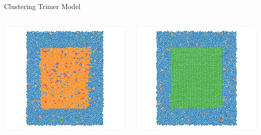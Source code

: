 \documentclass[aspectratio=169, 14pt]{beamer}
\begin{document}
\begin{frame}{Clustering Trimer Model}
\begin{columns}
\begin{column}{0.33\textwidth}
      \includegraphics[width=\textwidth]{clustering_results_p2gg.png}
    \end{column}
    \begin{column}{0.33\textwidth}
      \includegraphics[width=\textwidth]{clustering_results_pg.png}
    \end{column}
  \end{columns}
\end{frame}
\end{document}
